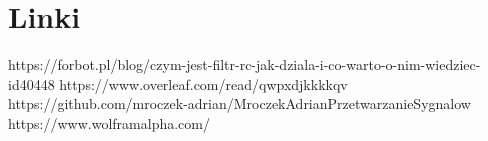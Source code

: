 \documentclass[12pt,oneside,a4paper]{book} %
\begin{document}
\chapter{Linki }

https://forbot.pl/blog/czym-jest-filtr-rc-jak-dziala-i-co-warto-o-nim-wiedziec-id40448 \newline
https://www.overleaf.com/read/qwpxdjkkkkqv \newline
https://github.com/mroczek-adrian/MroczekAdrianPrzetwarzanieSygnalow \newline
https://www.wolframalpha.com/  \newline
\end{document}
